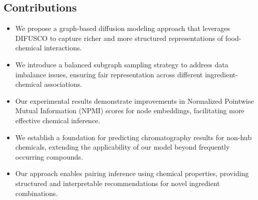 \subsection*{Contributions}
\begin{itemize}
    \item We propose a {graph-based diffusion modeling approach} that leverages {DIFUSCO} \cite{Sun2023} to capture richer and more structured representations of food-chemical interactions.
    \item We introduce a {balanced subgraph sampling} strategy to address data imbalance issues, ensuring fair representation across different ingredient-chemical associations.
    \item Our experimental results demonstrate improvements in {Normalized Pointwise Mutual Information (NPMI)} scores for node embeddings, facilitating more effective chemical inference.
    \item We establish a foundation for predicting chromatography results for {non-hub chemicals}, extending the applicability of our model beyond frequently occurring compounds.
    \item Our approach enables {pairing inference using chemical properties}, providing structured and interpretable recommendations for novel ingredient combinations.
\end{itemize}
